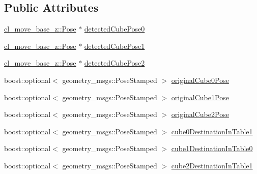 \subsection*{Public Attributes}
\begin{DoxyCompactItemize}
\item 
\hyperlink{classcl__move__base__z_1_1Pose}{cl\+\_\+move\+\_\+base\+\_\+z\+::\+Pose} $\ast$ \hyperlink{classsm__fetch__two__table__pick__n__place__1_1_1cl__perception__system_1_1ClPerceptionSystem_ab60765c4ba512b25c49c508464c49adb}{detected\+Cube\+Pose0}
\item 
\hyperlink{classcl__move__base__z_1_1Pose}{cl\+\_\+move\+\_\+base\+\_\+z\+::\+Pose} $\ast$ \hyperlink{classsm__fetch__two__table__pick__n__place__1_1_1cl__perception__system_1_1ClPerceptionSystem_adf8bf74ca5091581bf23335b8573073d}{detected\+Cube\+Pose1}
\item 
\hyperlink{classcl__move__base__z_1_1Pose}{cl\+\_\+move\+\_\+base\+\_\+z\+::\+Pose} $\ast$ \hyperlink{classsm__fetch__two__table__pick__n__place__1_1_1cl__perception__system_1_1ClPerceptionSystem_ab4594ab1597649673845c90002c8a8e7}{detected\+Cube\+Pose2}
\item 
boost\+::optional$<$ geometry\+\_\+msgs\+::\+Pose\+Stamped $>$ \hyperlink{classsm__fetch__two__table__pick__n__place__1_1_1cl__perception__system_1_1ClPerceptionSystem_a9a81fba6b953fba9b27e0a2f222290d0}{original\+Cube0\+Pose}
\item 
boost\+::optional$<$ geometry\+\_\+msgs\+::\+Pose\+Stamped $>$ \hyperlink{classsm__fetch__two__table__pick__n__place__1_1_1cl__perception__system_1_1ClPerceptionSystem_a08c5950cef16dc2e307ec5c3573ba3f8}{original\+Cube1\+Pose}
\item 
boost\+::optional$<$ geometry\+\_\+msgs\+::\+Pose\+Stamped $>$ \hyperlink{classsm__fetch__two__table__pick__n__place__1_1_1cl__perception__system_1_1ClPerceptionSystem_a25eb595d1c9f8256f4bd5ae1ac3d5651}{original\+Cube2\+Pose}
\item 
boost\+::optional$<$ geometry\+\_\+msgs\+::\+Pose\+Stamped $>$ \hyperlink{classsm__fetch__two__table__pick__n__place__1_1_1cl__perception__system_1_1ClPerceptionSystem_a4badbcb867d3baa93ddc40e73efe8d3f}{cube0\+Destination\+In\+Table1}
\item 
boost\+::optional$<$ geometry\+\_\+msgs\+::\+Pose\+Stamped $>$ \hyperlink{classsm__fetch__two__table__pick__n__place__1_1_1cl__perception__system_1_1ClPerceptionSystem_a06728bf2c7c0f56c02e485b46fbc0c93}{cube1\+Destination\+In\+Table0}
\item 
boost\+::optional$<$ geometry\+\_\+msgs\+::\+Pose\+Stamped $>$ \hyperlink{classsm__fetch__two__table__pick__n__place__1_1_1cl__perception__system_1_1ClPerceptionSystem_aacd55af08e30d8b6b1303a670acd3328}{cube2\+Destination\+In\+Table1}

\end{DoxyCompactItemize}

